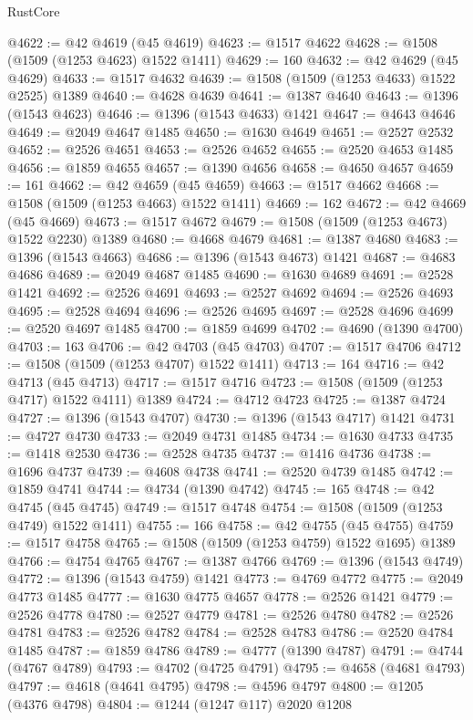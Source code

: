 \begin{lexlean}{RustCore}
\begin{coremodule}
@4622 := @42 @4619 (@45 @4619)
@4623 := @1517 @4622
@4628 := @1508 (@1509 (@1253 @4623) @1522 @1411)
@4629 := 160
@4632 := @42 @4629 (@45 @4629)
@4633 := @1517 @4632
@4639 := @1508 (@1509 (@1253 @4633) @1522 @2525) @1389
@4640 := @4628 @4639
@4641 := @1387 @4640
@4643 := @1396 (@1543 @4623)
@4646 := @1396 (@1543 @4633) @1421
@4647 := @4643 @4646
@4649 := @2049 @4647 @1485
@4650 := @1630 @4649
@4651 := @2527 @2532
@4652 := @2526 @4651
@4653 := @2526 @4652
@4655 := @2520 @4653 @1485
@4656 := @1859 @4655
@4657 := @1390 @4656
@4658 := @4650 @4657
@4659 := 161
@4662 := @42 @4659 (@45 @4659)
@4663 := @1517 @4662
@4668 := @1508 (@1509 (@1253 @4663) @1522 @1411)
@4669 := 162
@4672 := @42 @4669 (@45 @4669)
@4673 := @1517 @4672
@4679 := @1508 (@1509 (@1253 @4673) @1522 @2230) @1389
@4680 := @4668 @4679
@4681 := @1387 @4680
@4683 := @1396 (@1543 @4663)
@4686 := @1396 (@1543 @4673) @1421
@4687 := @4683 @4686
@4689 := @2049 @4687 @1485
@4690 := @1630 @4689
@4691 := @2528 @1421
@4692 := @2526 @4691
@4693 := @2527 @4692
@4694 := @2526 @4693
@4695 := @2528 @4694
@4696 := @2526 @4695
@4697 := @2528 @4696
@4699 := @2520 @4697 @1485
@4700 := @1859 @4699
@4702 := @4690 (@1390 @4700)
@4703 := 163
@4706 := @42 @4703 (@45 @4703)
@4707 := @1517 @4706
@4712 := @1508 (@1509 (@1253 @4707) @1522 @1411)
@4713 := 164
@4716 := @42 @4713 (@45 @4713)
@4717 := @1517 @4716
@4723 := @1508 (@1509 (@1253 @4717) @1522 @4111) @1389
@4724 := @4712 @4723
@4725 := @1387 @4724
@4727 := @1396 (@1543 @4707)
@4730 := @1396 (@1543 @4717) @1421
@4731 := @4727 @4730
@4733 := @2049 @4731 @1485
@4734 := @1630 @4733
@4735 := @1418 @2530
@4736 := @2528 @4735
@4737 := @1416 @4736
@4738 := @1696 @4737
@4739 := @4608 @4738
@4741 := @2520 @4739 @1485
@4742 := @1859 @4741
@4744 := @4734 (@1390 @4742)
@4745 := 165
@4748 := @42 @4745 (@45 @4745)
@4749 := @1517 @4748
@4754 := @1508 (@1509 (@1253 @4749) @1522 @1411)
@4755 := 166
@4758 := @42 @4755 (@45 @4755)
@4759 := @1517 @4758
@4765 := @1508 (@1509 (@1253 @4759) @1522 @1695) @1389
@4766 := @4754 @4765
@4767 := @1387 @4766
@4769 := @1396 (@1543 @4749)
@4772 := @1396 (@1543 @4759) @1421
@4773 := @4769 @4772
@4775 := @2049 @4773 @1485
@4777 := @1630 @4775 @4657
@4778 := @2526 @1421
@4779 := @2526 @4778
@4780 := @2527 @4779
@4781 := @2526 @4780
@4782 := @2526 @4781
@4783 := @2526 @4782
@4784 := @2528 @4783
@4786 := @2520 @4784 @1485
@4787 := @1859 @4786
@4789 := @4777 (@1390 @4787)
@4791 := @4744 (@4767 @4789)
@4793 := @4702 (@4725 @4791)
@4795 := @4658 (@4681 @4793)
@4797 := @4618 (@4641 @4795)
@4798 := @4596 @4797
@4800 := @1205 (@4376 @4798)
@4804 := @1244 (@1247 @117) @2020 @1208

\end{coremodule}
\end{lexlean}

